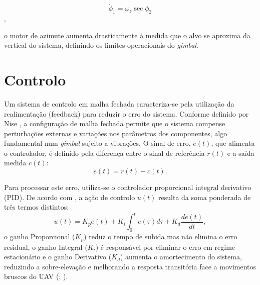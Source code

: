 \begin{equation}\dot{\phi}_1 = \omega_z \sec\phi_2\end{equation},

o motor de azimute aumenta drasticamente à medida que o alvo se aproxima da vertical do sistema, definindo os limites operacionais do \emph{gimbal}.

\section{Controlo}

Um sistema de controlo em malha fechada caracteriza-se pela utilização da realimentação (feedback) para reduzir o erro do sistema. Conforme definido por Nise \cite{nise2019control}, a configuração de malha fechada permite que o sistema compense perturbações externas e variações nos parâmetros dos componentes, algo fundamental num \emph{gimbal} sujeito a vibrações. O sinal de erro, $e(t)$, que alimenta o controlador, é definido pela diferença entre o sinal de referência $r(t)$ e a saída medida $c(t)$:
\begin{equation}e(t) = r(t) - c(t).\end{equation}

Para processar este erro, utiliza-se o controlador proporcional integral derivativo (PID). De acordo com \cite{bolton2018}, a ação de controlo $u(t)$ resulta da soma ponderada de três termos distintos:
\begin{equation}u(t) = K_p e(t) + K_i \int_{0}^{t} e(\tau) d\tau + K_d \frac{de(t)}{dt},\end{equation}
o ganho Proporcional ($K_p$) reduz o tempo de subida mas não elimina o erro residual, o ganho Integral ($K_i$) é responsável por eliminar o erro em regime estacionário e o ganho Derivativo ($K_d$) aumenta o amortecimento do sistema, reduzindo a sobre-elevação e melhorando a resposta transitória face a movimentos bruscos do UAV (\cite{nise2019control}; \cite{bolton2018}).

